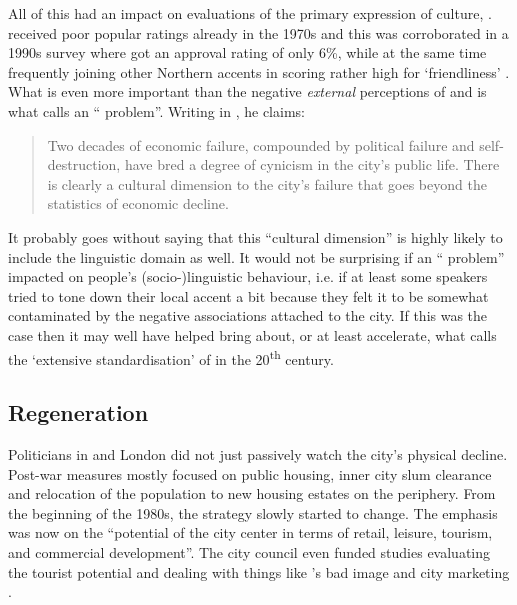 All of this had an impact on evaluations of the primary expression of  culture, .
 received poor popular ratings already in the 1970s and this was corroborated in a 1990s survey where  got an approval rating of only 6\%, while at the same time frequently joining other Northern accents in scoring rather high for `friendliness' \citep[cf.][166]{wales2006}.
What is even more important than the negative \emph{external} perceptions of  and  is what \citet[255]{parkinson1990} calls an `` problem''.
Writing in \citeyear{parkinson1990}, he claims: 
	\begin{quote}
		Two decades of economic failure, compounded by political failure and self-destruction, have bred a degree of cynicism in the city's public life. There is clearly a cultural dimension to the city's failure that goes beyond the statistics of economic decline.
	\end{quote}
It probably goes without saying that this ``cultural dimension'' is highly likely to include the linguistic domain as well.
It would not be surprising if an `` problem'' impacted on people's (socio-)linguistic behaviour, i.e. if at least some speakers tried to tone down their local accent a bit because they felt it to be somewhat contaminated by the negative associations attached to the city.
If this was the case then it may well have helped bring about, or at least accelerate, what \citet{knowles1978} calls the `extensive standardisation' of  in the 20\textsuperscript{th} century.

		\subsection{Regeneration}\label{sec.hist.20.regen}

Politicians in  and London did not just passively watch the city's physical decline.
Post-war measures mostly focused on public housing, inner city slum clearance and relocation of the population to new housing estates on the periphery.
From the beginning of the 1980s, the strategy slowly started to change.
The emphasis was now on the ``potential of the city center in terms of retail, leisure, tourism, and commercial development''.
The city council even funded studies evaluating the tourist potential and dealing with things like 's bad image and city marketing \citep[cf.][250--253]{parkinson1990}.

